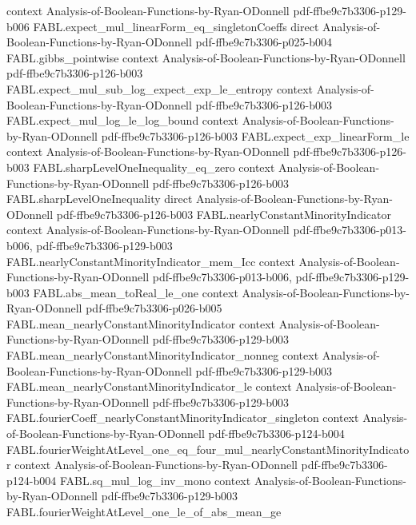 \begin{theorem}
  {context}
  {Analysis-of-Boolean-Functions-by-Ryan-ODonnell}
  {pdf-ffbe9c7b3306-p129-b006}
\proofstep
  {FABL.expect_mul_linearForm_eq_singletonCoeffs}
  {direct}
  {Analysis-of-Boolean-Functions-by-Ryan-ODonnell}
  {pdf-ffbe9c7b3306-p025-b004}
\proofstep
  {FABL.gibbs_pointwise}
  {context}
  {Analysis-of-Boolean-Functions-by-Ryan-ODonnell}
  {pdf-ffbe9c7b3306-p126-b003}
\proofstep
  {FABL.expect_mul_sub_log_expect_exp_le_entropy}
  {context}
  {Analysis-of-Boolean-Functions-by-Ryan-ODonnell}
  {pdf-ffbe9c7b3306-p126-b003}
\proofstep
  {FABL.expect_mul_log_le_log_bound}
  {context}
  {Analysis-of-Boolean-Functions-by-Ryan-ODonnell}
  {pdf-ffbe9c7b3306-p126-b003}
\proofstep
  {FABL.expect_exp_linearForm_le}
  {context}
  {Analysis-of-Boolean-Functions-by-Ryan-ODonnell}
  {pdf-ffbe9c7b3306-p126-b003}
\proofstep
  {FABL.sharpLevelOneInequality_eq_zero}
  {context}
  {Analysis-of-Boolean-Functions-by-Ryan-ODonnell}
  {pdf-ffbe9c7b3306-p126-b003}
\proofstep
  {FABL.sharpLevelOneInequality}
  {direct}
  {Analysis-of-Boolean-Functions-by-Ryan-ODonnell}
  {pdf-ffbe9c7b3306-p126-b003}
\proofstep
  {FABL.nearlyConstantMinorityIndicator}
  {context}
  {Analysis-of-Boolean-Functions-by-Ryan-ODonnell}
  {pdf-ffbe9c7b3306-p013-b006,
    pdf-ffbe9c7b3306-p129-b003}
\proofstep
  {FABL.nearlyConstantMinorityIndicator_mem_Icc}
  {context}
  {Analysis-of-Boolean-Functions-by-Ryan-ODonnell}
  {pdf-ffbe9c7b3306-p013-b006,
    pdf-ffbe9c7b3306-p129-b003}
\proofstep
  {FABL.abs_mean_toReal_le_one}
  {context}
  {Analysis-of-Boolean-Functions-by-Ryan-ODonnell}
  {pdf-ffbe9c7b3306-p026-b005}
\proofstep
  {FABL.mean_nearlyConstantMinorityIndicator}
  {context}
  {Analysis-of-Boolean-Functions-by-Ryan-ODonnell}
  {pdf-ffbe9c7b3306-p129-b003}
\proofstep
  {FABL.mean_nearlyConstantMinorityIndicator_nonneg}
  {context}
  {Analysis-of-Boolean-Functions-by-Ryan-ODonnell}
  {pdf-ffbe9c7b3306-p129-b003}
\proofstep
  {FABL.mean_nearlyConstantMinorityIndicator_le}
  {context}
  {Analysis-of-Boolean-Functions-by-Ryan-ODonnell}
  {pdf-ffbe9c7b3306-p129-b003}
\proofstep
  {FABL.fourierCoeff_nearlyConstantMinorityIndicator_singleton}
  {context}
  {Analysis-of-Boolean-Functions-by-Ryan-ODonnell}
  {pdf-ffbe9c7b3306-p124-b004}
\proofstep
  {FABL.fourierWeightAtLevel_one_eq_four_mul_nearlyConstantMinorityIndicator}
  {context}
  {Analysis-of-Boolean-Functions-by-Ryan-ODonnell}
  {pdf-ffbe9c7b3306-p124-b004}
\proofstep
  {FABL.sq_mul_log_inv_mono}
  {context}
  {Analysis-of-Boolean-Functions-by-Ryan-ODonnell}
  {pdf-ffbe9c7b3306-p129-b003}
\proofstep
  {FABL.fourierWeightAtLevel_one_le_of_abs_mean_ge}

\end{theorem}
